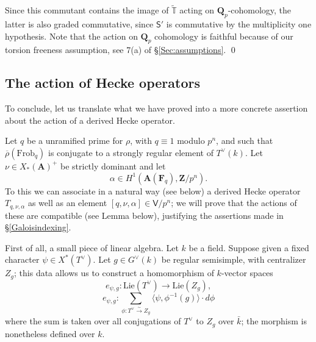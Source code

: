 \documentclass[10pt]{amsart}
\newcommand\mnote[1]{\marginpar{\tiny #1}}
\newcommand{\Z}{\mathbf{Z}}
\newcommand{\Lie}{\mathrm{Lie}}
\newcommand{\rhobar}{\overline{\rho}}
\newcommand{\gHecke}{\tilde{\mathbb{T}}}
\newcommand{\Frob}{\mathrm{Frob}}
\newcommand{\Vinf}{\mathsf{V}}
\newcommand{\Q}{\mathbf{Q}}
\theoremstyle{remark}
\newcommand{\BWq}{\mathsf{q}}
\newcommand{\F}{\mathbf{F}}
\begin{document}
{Since this commutant contains  the image of $\gHecke$
acting on $\Q_p$-cohomology, the latter is also graded commutative, since $\mathsf{S}'$ is commutative by the multiplicity one hypothesis.   Note that the action on $\Q_p$ cohomology
is faithful because of our torsion freeness assumption, see 7(a) of  \S \ref{Sec:assumptions}.
% 
%
  }
\qed




 \subsection{The action of Hecke operators}  \label{Galoisindexingproofs}
 To conclude, let us translate what we have proved into a more concrete   assertion about the action of a derived Hecke operator. 
 
 Let $q$ be a unramified prime for $\rho$,  with $q \equiv 1$ modulo $p^n$, and such that
 $\rhobar(\Frob_q)$ is conjugate to a strongly regular element of $T^{\vee}(k)$. Let $\nu \in X_*(\mathbf{A})^+$ be strictly dominant 
and let
  $$\alpha \in H^1(\mathbf{A}(\F_q), \Z/p^n).$$ 
  To this we can associate in a natural way (see below) a derived Hecke operator $T_{q, \nu, \alpha}$
  as well as an element $[q, \nu, \alpha] \in \Vinf/p^n$; we will prove
  that the actions of these are compatible (see Lemma below), 
 justifying the assertions made in \S \ref{Galoisindexing}. 


First of all,
a small piece of linear algebra. Let $k$ be a field.  Suppose given a  fixed character $\psi \in X^*(T^{\vee})$. 
Let $g \in G^{\vee}(k)$ be regular semisimple, with centralizer $Z_g$; 
this data allows us to construct a homomorphism of $k$-vector spaces
$$e_{\psi,g}: \mathrm{Lie}(T^{\vee}) \rightarrow \Lie(Z_g),$$ 
$$ e_{\psi,g}:  \sum_{\phi: T^{\vee} \stackrel{\sim}{\rightarrow} Z_g} \langle \psi, \phi^{-1}(g) \rangle \cdot d\phi$$
where the sum is taken over all conjugations of $T^{\vee}$ to $Z_g$ over $\bar{k}$;
the morphism is nonetheless defined over $k$. 
\end{document}
